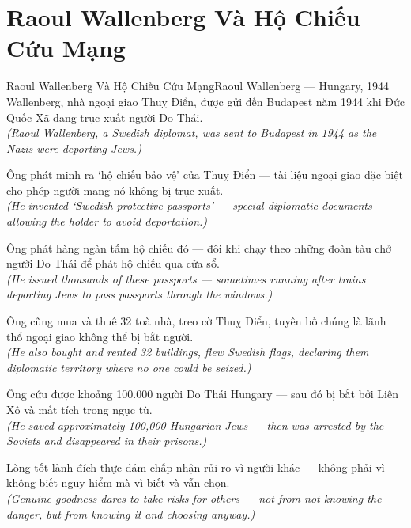 \section{Raoul Wallenberg Và Hộ Chiếu Cứu Mạng}
\begin{truyen}{Raoul Wallenberg Và Hộ Chiếu Cứu Mạng}{Raoul Wallenberg --- Hungary, 1944}
 Wallenberg, nhà ngoại giao Thuỵ Điển, được gửi đến Budapest năm 1944 khi Đức Quốc Xã đang trục xuất người Do Thái.\\[4pt]
\textit{(Raoul Wallenberg, a Swedish diplomat, was sent to Budapest in 1944 as the Nazis were deporting Jews.)}

Ông phát minh ra `hộ chiếu bảo vệ' của Thuỵ Điển --- tài liệu ngoại giao đặc biệt cho phép người mang nó không bị trục xuất.\\[4pt]
\textit{(He invented `Swedish protective passports' --- special diplomatic documents allowing the holder to avoid deportation.)}

Ông phát hàng ngàn tấm hộ chiếu đó --- đôi khi chạy theo những đoàn tàu chở người Do Thái để phát hộ chiếu qua cửa sổ.\\[4pt]
\textit{(He issued thousands of these passports --- sometimes running after trains deporting Jews to pass passports through the windows.)}

Ông cũng mua và thuê 32 toà nhà, treo cờ Thuỵ Điển, tuyên bố chúng là lãnh thổ ngoại giao không thể bị bắt người.\\[4pt]
\textit{(He also bought and rented 32 buildings, flew Swedish flags, declaring them diplomatic territory where no one could be seized.)}

Ông cứu được khoảng 100.000 người Do Thái Hungary --- sau đó bị bắt bởi Liên Xô và mất tích trong ngục tù.\\[4pt]
\textit{(He saved approximately 100,000 Hungarian Jews --- then was arrested by the Soviets and disappeared in their prisons.)}

\end{truyen}
\begin{baihoc}
  Lòng tốt lành đích thực dám chấp nhận rủi ro vì người khác --- không phải vì không biết nguy hiểm mà vì biết và vẫn chọn.\\[4pt]
  \textit{(Genuine goodness dares to take risks for others --- not from not knowing the danger, but from knowing it and choosing anyway.)}
\end{baihoc}

